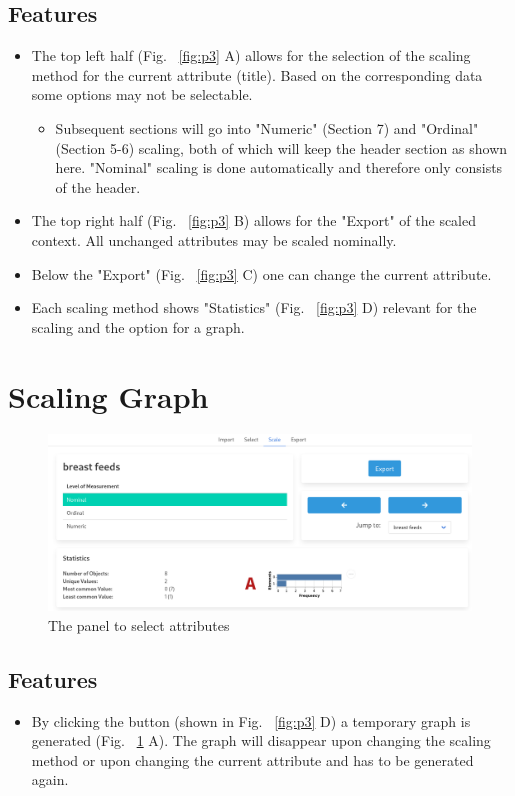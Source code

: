 \documentclass[]{report}
\begin{document}
\subsection{Features}
\begin{itemize}
    \item The top left half (Fig. ~\ref{fig:p3} A) allows for the selection of the scaling method for the current attribute (title). Based on the corresponding data some options may not be selectable.
    \begin{itemize}
        \item Subsequent sections will go into "Numeric" (Section 7) and "Ordinal" (Section 5-6) scaling, both of which will keep the header section as shown here. "Nominal" scaling is done automatically and therefore only consists of the header.
    \end{itemize}
    \item The top right half (Fig. ~\ref{fig:p3} B) allows for the "Export" of the scaled context. All unchanged attributes may be scaled nominally.
    \item Below the "Export" (Fig. ~\ref{fig:p3} C) one can change the current attribute.
    \item Each scaling method shows "Statistics" (Fig. ~\ref{fig:p3} D) relevant for the scaling and the option for a graph.
\end{itemize}

\section{Scaling Graph}
\begin{figure}[H]
	\includegraphics[width=\linewidth]{final_presentation/images/nominal_graph.png}
	\caption{The panel to select attributes}
	\label{fig:p4}
\end{figure}
\subsection{Features}
\begin{itemize}
    \item By clicking the button (shown in Fig. ~\ref{fig:p3} D)  a temporary graph is generated (Fig. ~\ref{fig:p4} A). The graph will disappear upon changing the scaling method or upon changing the current attribute and has to be generated again.
\end{itemize}
\end{document}
